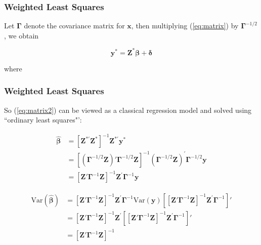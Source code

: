 \documentclass[%
xcolor=pdftex]{beamer}
\begin{document}
\begin{frame}
\frametitle{Weighted Least Squares}

Let $\boldsymbol{\Gamma}$ denote the covariance matrix for $\boldsymbol{x}$, then multiplying (\ref{eq:matrix}) by $\boldsymbol{\Gamma}^{-1/2}$, we obtain\\

\vspace{15mm}

\begin{equation} \label{eq:matrix2}
\boldsymbol{y^*} = \boldsymbol{Z^* \beta} + \boldsymbol{\delta}
\end{equation}

where

\vspace{30mm}

\end{frame}

\begin{frame}
\frametitle{Weighted Least Squares}

So (\ref{eq:matrix2}) can be viewed as a classical regression model and solved using ``ordinary least squares"': 

\begin{align*}
\hat{\boldsymbol{\beta}} 
&= \left[\boldsymbol{Z}^{*'}\boldsymbol{Z}^* \right]^{-1} \boldsymbol{Z}^{*'} \boldsymbol{y}^* \\
&= \left[\left(\boldsymbol{\Gamma}^{-1/2}\boldsymbol{Z} \right)' \boldsymbol{\Gamma}^{-1/2}\boldsymbol{Z} \right]^{-1} \left(\boldsymbol{\Gamma}^{-1/2}\boldsymbol{Z}\right)^{'} \boldsymbol{\Gamma}^{-1/2} \boldsymbol{y} \\ 
&= \left[ \boldsymbol{Z}'  \boldsymbol{\Gamma}^{-1} \boldsymbol{Z} \right]^{-1} \boldsymbol{Z}^{'}\boldsymbol{\Gamma}^{-1} \boldsymbol{y}
\end{align*}

\begin{align*}
\text{Var}\left( \hat{\boldsymbol{\beta}} \right) 
&= \left[ \boldsymbol{Z}'  \boldsymbol{\Gamma}^{-1} \boldsymbol{Z} \right]^{-1} \boldsymbol{Z}^{'}\boldsymbol{\Gamma}^{-1}\text{Var}(\boldsymbol{y})\left[ \left[ \boldsymbol{Z}'  \boldsymbol{\Gamma}^{-1} \boldsymbol{Z} \right]^{-1} \boldsymbol{Z}^{'}\boldsymbol{\Gamma}^{-1} \right]' \\
&= \left[ \boldsymbol{Z}'  \boldsymbol{\Gamma}^{-1} \boldsymbol{Z} \right]^{-1} \boldsymbol{Z}^{'}\left[ \left[ \boldsymbol{Z}'  \boldsymbol{\Gamma}^{-1} \boldsymbol{Z} \right]^{-1} \boldsymbol{Z}^{'}\boldsymbol{\Gamma}^{-1} \right]' \\
&=  \left[ \boldsymbol{Z}'  \boldsymbol{\Gamma}^{-1} \boldsymbol{Z} \right]^{-1} 
\end{align*}

\end{frame}
\end{document}
